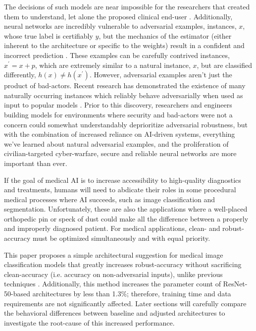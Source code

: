\documentclass[10pt,twocolumn,letterpaper]{article}
\begin{document}
  The decisions of such models are near impossible for the researchers that created them to understand, let alone the proposed clinical end-user \cite{Med-XAI}. Additionally, neural networks are incredibly vulnerable to adversarial examples, instances, $x$, whose true label is certifiably $y$, but the mechanics of the estimator (either inherent to the architecture or specific to the weights) result in a confident and incorrect prediction \cite{Intro-Adv}. These examples can be carefully contrived instances, $x^\prime = x + p$, which are extremely similar to a natural instance, $x$, but are classified differently, $h(x) \not = h(x^\prime)$. However, adversarial examples aren't just the product of bad-actors. Recent research has demonstrated the existence of many naturally occurring instances which reliably behave adversarially when used as input to popular models \cite{Natural-Adv}. Prior to this discovery, researchers and engineers building models for environments where security and bad-actors were not a concern could somewhat understandably deprioritize adversarial robustness, but with the combination of increased reliance on AI-driven systems, everything we've learned about natural adversarial examples, and the proliferation of civilian-targeted cyber-warfare, secure and reliable neural networks are more important than ever.

  If the goal of medical AI is to increase accessibility to high-quality diagnostics and treatments, humans will need to abdicate their roles in some procedural medical processes where AI succeeds, such as image classification and segmentation. Unfortunately, these are also the applications where a well-placed orthopedic pin or speck of dust could make all the difference between a properly and improperly diagnosed patient. For medical applications, clean- and robust-accuracy must be optimized simultaneously and with equal priority.

  This paper proposes a simple architectural suggestion for medical image classification models that greatly increases robust-accuracy without sacrificing clean-accuracy (i.e. accuracy on non-adversarial inputs), unlike previous techniques \cite{RobustVsAccuracy}. Additionally, this method increases the parameter count of ResNet-50-based \cite{ResNet} architectures by less than 1.3\%; therefore, training time and data requirements are not significantly affected. Later sections will carefully compare the behavioral differences between baseline and adjusted architectures to investigate the root-cause of this increased performance.
\end{document}
